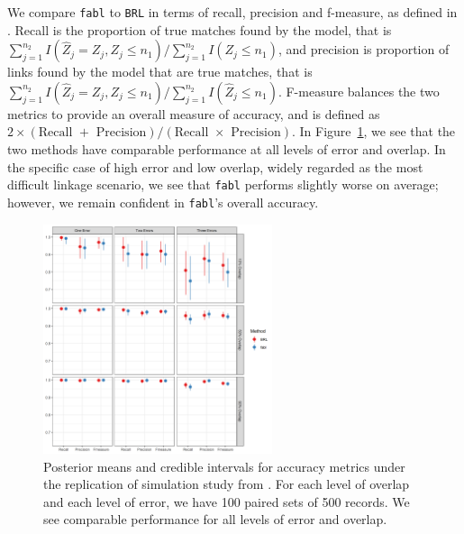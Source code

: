 \documentclass[ba]{imsart}
\begin{document}
We compare \texttt{fabl} to \texttt{BRL} in terms of recall, precision and f-measure, as defined in \cite{christen_2012}. Recall is the proportion of true matches found by the model, that is $\sum_{j=1}^{n_2} I(\hat{Z}_j = Z_j, Z_j \leq n_1) / \sum_{j=1}^{n_2} I(Z_j \leq n_1)$, and precision is proportion of links found by the model that are true matches, that is $\sum_{j=1}^{n_2} I(\hat{Z}_j = Z_j, Z_j \leq n_1) / \sum_{j=1}^{n_2} I(\hat{Z}_j \leq n_1)$. F-measure balances the two metrics to provide an overall measure of accuracy, and is defined as $2 \times (\text{Recall } + \text{ Precision}) / (\text{Recall } \times \text{ Precision})$. In Figure~\ref{fig:sadinle_simulation}, we see that the two methods have comparable performance at all levels of error and overlap. In the specific case of high error and low overlap, widely regarded as the most difficult linkage scenario, we see that \texttt{fabl} performs slightly worse on average; however, we remain confident in \texttt{fabl}'s overall accuracy. 





\begin{figure}[t]
	\begin{center}
\includegraphics[width=0.6\textwidth]{../notes/figures/sadinle_sim_plot2} 
\caption{Posterior means and credible intervals for accuracy metrics under the replication of simulation study from \cite{sadinle_bayesian_2017}. For each level of overlap and each level of error, we have 100 paired sets of 500 records. We see comparable performance for all levels of error and overlap.}
\label{fig:sadinle_simulation}
	\end{center}
\end{figure}
\end{document}
